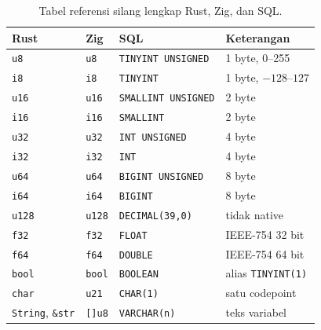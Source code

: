 \documentclass[11pt,a4paper]{article}
\begin{document}
\begin{table}[H]
	\centering
	\caption{Tabel referensi silang lengkap Rust, Zig, dan SQL.}
	\label{tab:master}
	\footnotesize
	\begin{tabularx}{\textwidth}{l l l X}
		\toprule
		Rust                            & Zig                     & SQL                        & Keterangan                \\
		\midrule
		\texttt{u8}                     & \texttt{u8}             & \texttt{TINYINT UNSIGNED}  & 1 byte, 0--255            \\
		\texttt{i8}                     & \texttt{i8}             & \texttt{TINYINT}           & 1 byte, $-128$--$127$     \\
		\texttt{u16}                    & \texttt{u16}            & \texttt{SMALLINT UNSIGNED} & 2 byte                    \\
		\texttt{i16}                    & \texttt{i16}            & \texttt{SMALLINT}          & 2 byte                    \\
		\texttt{u32}                    & \texttt{u32}            & \texttt{INT UNSIGNED}      & 4 byte                    \\
		\texttt{i32}                    & \texttt{i32}            & \texttt{INT}               & 4 byte                    \\
		\texttt{u64}                    & \texttt{u64}            & \texttt{BIGINT UNSIGNED}   & 8 byte                    \\
		\texttt{i64}                    & \texttt{i64}            & \texttt{BIGINT}            & 8 byte                    \\
		\texttt{u128}                   & \texttt{u128}           & \texttt{DECIMAL(39,0)}     & tidak native              \\
		\texttt{f32}                    & \texttt{f32}            & \texttt{FLOAT}             & IEEE-754 32 bit           \\
		\texttt{f64}                    & \texttt{f64}            & \texttt{DOUBLE}            & IEEE-754 64 bit           \\
		\texttt{bool}                   & \texttt{bool}           & \texttt{BOOLEAN}           & alias \texttt{TINYINT(1)} \\
		\texttt{char}                   & \texttt{u21}            & \texttt{CHAR(1)}           & satu codepoint            \\
		\texttt{String}, \texttt{\&str} & \texttt{[]u8}           & \texttt{VARCHAR(n)}        & teks variabel             \\

\end{tabularx}
\end{table}
\end{document}
